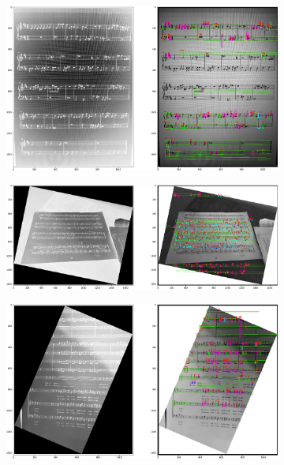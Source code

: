 \documentclass[12pt]{article}
\begin{document}
\begin{enumerate}
\begin{figure}
\begin{subfigure}[b]{0.48\linewidth}
				\end{subfigure}
				\begin{subfigure}[b]{0.48\linewidth}
					\includegraphics[width=\linewidth]{Hard/Zdj26.png}
				\end{subfigure}
				\begin{subfigure}[b]{0.48\linewidth}
					\includegraphics[width=\linewidth]{Hard/Zdj27.png}
				\end{subfigure}
				\begin{subfigure}[b]{0.48\linewidth}
					\includegraphics[width=\linewidth]{Hard/Zdj28.png}

\end{subfigure}
\end{figure}
\end{enumerate}
\end{document}
